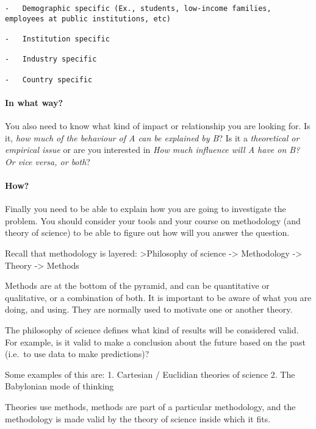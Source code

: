 \documentclass[10pt,twoside]{article}
\let\oldparagraph\paragraph
\renewcommand{\paragraph}[1]{\oldparagraph{#1}\mbox{}}
\begin{document}
\begin{verbatim}
-   Demographic specific (Ex., students, low-income families, employees at public institutions, etc)

-   Institution specific

-   Industry specific

-   Country specific
\end{verbatim}

\hypertarget{in-what-way}{%
\paragraph{In what way?}\label{in-what-way}}

You also need to know what kind of impact or relationship you are
looking for. Is it, \emph{how much of the behaviour of A can be
explained by B}? Is it a \emph{theoretical or empirical issue} or are
you interested in \emph{How much influence will A have on B? Or vice
versa, or both}?

\hypertarget{how}{%
\paragraph{How?}\label{how}}

Finally you need to be able to explain how you are going to investigate
the problem. You should consider your tools and your course on
methodology (and theory of science) to be able to figure out how will
you answer the question.

Recall that methodology is layered: \textgreater{}Philosophy of science
-\textgreater{} Methodology -\textgreater{} Theory -\textgreater{}
Methods

Methods are at the bottom of the pyramid, and can be quantitative or
qualitative, or a combination of both. It is important to be aware of
what you are doing, and using. They are normally used to motivate one or
another theory.

The philosophy of science defines what kind of results will be
considered valid. For example, is it valid to make a conclusion about
the future based on the past (i.e.~to use data to make predictions)?

Some examples of this are: 1. Cartesian / Euclidian theories of science
2. The Babylonian mode of thinking

Theories use methods, methods are part of a particular methodology, and
the methodology is made valid by the theory of science inside which it
fits.
\end{document}

